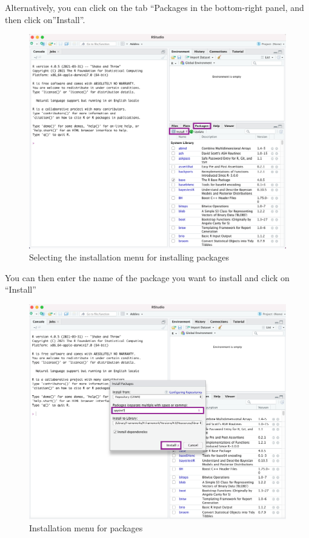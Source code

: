 \documentclass[
]{book}
\begin{document}
Alternatively, you can click on the tab ``Packages in the bottom-right panel, and then click on''Install''.

\begin{figure}

{\centering \includegraphics[width=0.85\linewidth]{Packages_Install} 

}

\caption{Selecting the installation menu for installing packages}\label{fig:install1}
\end{figure}

You can then enter the name of the package you want to install and click on ``Install''

\begin{figure}

{\centering \includegraphics[width=0.85\linewidth]{Packages_Installed} 

}

\caption{Installation menu for packages}\label{fig:install2}
\end{figure}
\end{document}
